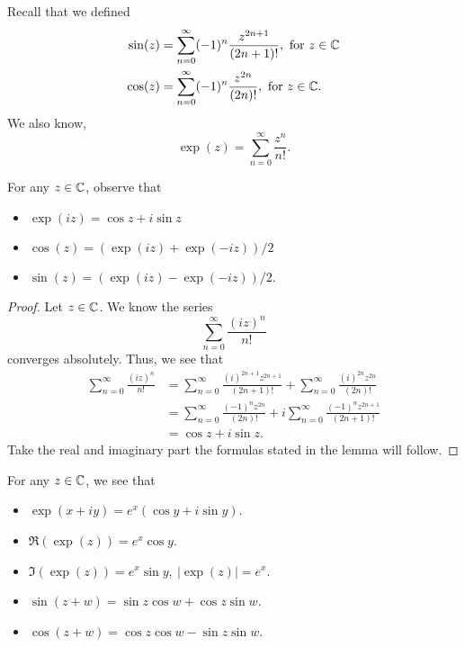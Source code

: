 \documentclass[a4paper]{report}
\begin{document}
Recall that we defined 
\begin{align*}
    \sin(z) &= \sum_{ n=0  }^{ \infty  } (-1)^{n} \frac{ z^{2n+1} }{ (2n+1)! } , \ \text{for} \ z \in \mathbb{C}  \\
    \cos(z) &= \sum_{ n = 0  }^{ \infty  } (-1)^{n} \frac{ z^{2n}  }{ (2n)! } , \ \text{for} \ z \in \mathbb{C}. 
\end{align*}
We also know,
\[  \exp(z) = \sum_{ n=0 }^{ \infty  } \frac{ z^{n} }{ n! }.  \]

\begin{lemma}
    For any \( z \in \mathbb{C}  \), observe that
    \begin{itemize}
        \item \( \exp(iz) = \cos z + i \sin z  \)
        \item \( \cos(z) = (\exp(iz) + \exp(-iz)) / 2 \) 
        \item \( \sin(z) = (\exp(iz) - \exp(-iz)) / 2 \).
    \end{itemize}
\end{lemma}

\begin{proof}
Let \( z \in \mathbb{C}  \). We know the series
\[  \sum_{ n=0 }^{ \infty  } \frac{ (iz)^{n} }{ n! }  \] converges absolutely.
Thus, we see that
\begin{align*}
    \sum_{ n=0 }^{ \infty  } \frac{ (iz)^{n} }{ n! } &= \sum_{ n=0 }^{ \infty  } \frac{ (i)^{2n+1} z^{2n+1} }{ (2n+1)! }  + \sum_{ n=0 }^{ \infty  } \frac{ (i)^{2n} z^{2n} }{ (2n)! }  \\
                                                     &= \sum_{ n=0 }^{ \infty  } \frac{ (-1)^{n} z^{2n} }{ (2n)! }  +  i  \sum_{ n=0 }^{ \infty  } \frac{ (-1)^{n} z^{2n+1} }{ (2n+1)! } \\
                                                     &= \cos z + i \sin z.
\end{align*}
Take the real and imaginary part the formulas stated in the lemma will follow.
\end{proof}

\begin{corollary}
    For any \( z \in \mathbb{C}  \), we see that 
    \begin{itemize}
        \item \( \exp(x + iy) = e^{x} (\cos y + i \sin y) \).  
        \item \( \Re(\exp(z)) = e^{x} \cos y \).
        \item \( \Im(\exp(z)) = e^{x} \sin y, \ | \exp(z) |  = e^{x} \).
        \item \( \sin(z +w) = \sin z \cos w + \cos z \sin w \).
        \item  \( \cos(z + w) = \cos z \cos w - \sin z \sin w  \).
    \end{itemize}
\end{corollary}
\end{document}
